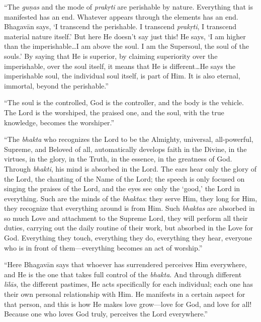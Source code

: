 \enquote{The \textit{guṇas} and the mode of \textit{prakṛti} are perishable by nature. Everything that is manifested has an end. Whatever appears through the elements has an end. Bhagavān says, \enquote{I transcend the perishable. I transcend \textit{prakṛti}, I transcend material nature itself.} But here He doesn’t say just this! He says, \enquote{I am higher than the imperishable\ldots I am above the soul. I am the Supersoul, the soul of the souls.} By saying that He is superior, by claiming superiority over the imperishable, over the soul itself, it means that He is different\ldots He says the imperishable soul, the individual soul itself, is part of Him. It is also eternal, immortal, beyond the perishable.}

\enquote{The soul is the controlled, God is the controller, and the body is the vehicle. The Lord is the worshiped, the praised one, and the soul, with the true knowledge, becomes the worshiper.}

\enquote{The \textit{bhakta} who recognizes the Lord to be the Almighty, universal, all-powerful, Supreme, and Beloved of all, automatically develops faith in the Divine, in the virtues, in the glory, in the Truth, in the essence, in the greatness of God. Through \textit{bhakti}, his mind is absorbed in the Lord. The ears hear only the glory of the Lord, the chanting of the Name of the Lord; the speech is only focused on singing the praises of the Lord, and the eyes see only the \enquote{good,} the Lord in everything. Such are the minds of the \textit{bhaktas}: they serve Him, they long for Him, they recognize that everything around is from Him. Such \textit{bhaktas} are absorbed in so much Love and attachment to the Supreme Lord, they will perform all their duties, carrying out the daily routine of their work, but absorbed in the Love for God. Everything they touch, everything they do, everything they hear, everyone who is in front of them---everything becomes an act of worship.}

\enquote{Here Bhagavān says that whoever has surrendered perceives Him everywhere, and He is the one that takes full control of the \textit{bhakta}. And through different \textit{līlās}, the different pastimes, He acts specifically for each individual; each one has their own personal relationship with Him. He manifests in a certain aspect for that person, and this is how He makes love grow---love for God, and love for all! Because one who loves God truly, perceives the Lord everywhere.}

